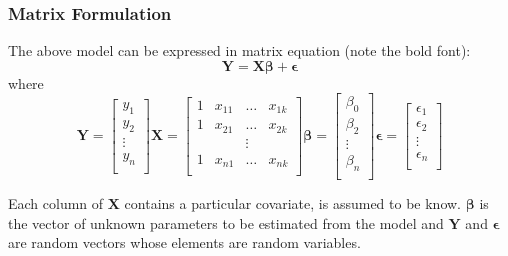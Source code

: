 \subsubsection{Matrix Formulation}
The above model can be expressed in matrix equation (note the bold font):
\begin{equation}
    \bm{Y} = \bm{X}\bm{\beta} + \bm{\epsilon}
\end{equation}
where
\begin{equation}
    \bm{Y} = 
    \begin{bmatrix}
        y_1\\y_2\\\vdots\\y_n\\
    \end{bmatrix}
    \bm{X} = 
    \begin{bmatrix}
        1 & x_{11} & \dots & x_{1k}\\
        1 & x_{21} & \dots & x_{2k}\\
        & & \vdots & \\
        1 & x_{n1} & \dots & x_{nk}\\
    \end{bmatrix}
    \bm{\beta} =
    \begin{bmatrix}
        \beta_0\\\beta_2\\\vdots\\\beta_n\\
    \end{bmatrix}
    \bm{\epsilon} = 
    \begin{bmatrix}
        \epsilon_1\\ \epsilon_2 \\ \vdots \\ \epsilon_n\\
    \end{bmatrix}
\end{equation}

Each column of $\bm{X}$ contains a particular covariate, is assumed to be know.
$\bm{\beta}$ is the vector of unknown parameters to be estimated from the model and
$\bm{Y}$ and $\bm{\epsilon}$ are random vectors whose elements are random variables.

